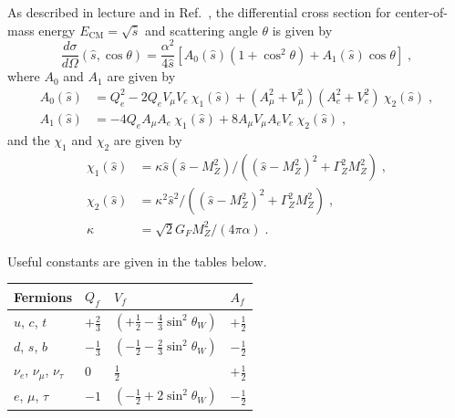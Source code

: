 As described in lecture and in Ref.~\cite{Papaefstathiou:2014mya}, the differential cross section for center-of-mass energy $E_\text{CM} = \sqrt{\hat s}$ and scattering angle $\theta$ is given by
\begin{equation}
  \label{eq:partonicxs}
  \frac{ d\sigma } { d \Omega }(\hat s, \cos\theta) = \frac{\alpha^2}{4 \hat{s} } \left[ A_0 (\hat s) ( 1  + \cos ^2 \theta ) + A_1(\hat s) \cos \theta \right] \;,
\end{equation}
where $A_0$ and $A_1$ are given by
\begin{align}
  A_0(\hat s) & = Q_e^2 - 2 Q_e V_\mu  V_e ~\chi_1(\hat s) + (A_\mu^2 + V_\mu^2)  (A_e^2 + V_e^2)  ~\chi_2(\hat s)\;, \nonumber \\
  A_1(\hat s) & = -4 Q_e  A_\mu A_e ~\chi_1(\hat s) + 8 A_\mu V_\mu A_e V_e ~ \chi_2(\hat s)\;,
\end{align}
and the $\chi_1$ and $\chi_2$ are given by
\begin{align}
  \chi_1 (\hat{s}) & = \kappa \hat{s} ( \hat{s} - M_Z^2 ) / (  (\hat{s}-M_Z^2)^2 + \Gamma_Z^2 M_Z^2 ) \;, \nonumber \\
  \chi_2 (\hat{s}) & = \kappa^2 \hat{s}^2 / (  (\hat{s}-M_Z^2)^2 + \Gamma_Z^2 M_Z^2 ) \;, \nonumber                 \\
  \kappa           & = \sqrt{2} G_F M_Z^2 / (4 \pi \alpha) \;.
\end{align}

Useful constants are given in the tables below.

\begin{center}
  \begin{tabular}{llll}
    Fermions                       & $Q_f$          & $V_f$                                            & $A_f$          \\ \hline
    $u$, $c$, $t$                  & $+\frac{2}{3}$ & $(+\frac{1}{2} - \frac{4}{3} \sin ^2 \theta_W )$ & $+\frac{1}{2}$ \\
    $d$, $s$, $b$                  & $-\frac{1}{3}$ & $(-\frac{1}{2} - \frac{2}{3} \sin ^2 \theta_W )$ & $-\frac{1}{2}$ \\
    $\nu_e$, $\nu_\mu$, $\nu_\tau$ & $0$            & $\frac{1}{2}$                                    & $+\frac{1}{2}$ \\
    $e$, $\mu$, $\tau$             & $-1$           & $(-\frac{1}{2} + 2 \sin ^2 \theta_W )$           & $-\frac{1}{2}$ \\
  \end{tabular}
\end{center}

